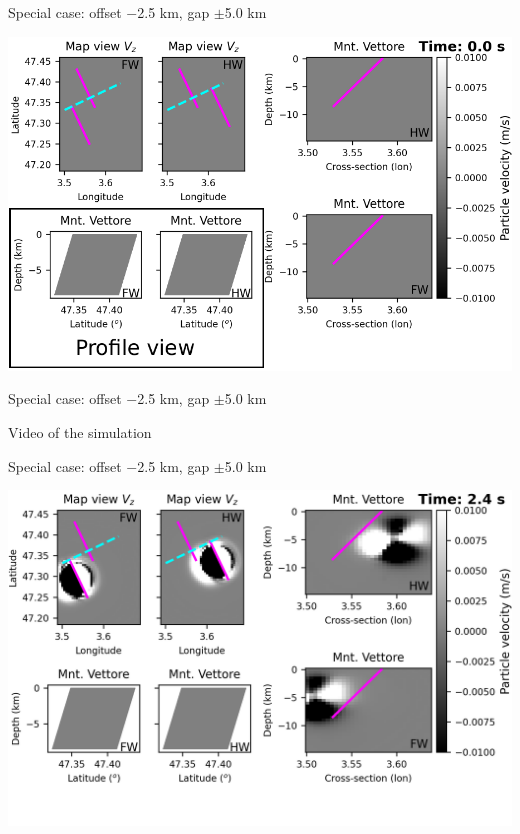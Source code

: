 \documentclass{beamer}
\begin{document}
\begin{frame}
 {Special case: offset $-$2.5 km, gap $\pm$5.0 km}

\begin{center}
    \includegraphics[width=1\linewidth]{images/horizontal_delta_00000c}
\end{center}
\addtocounter{framenumber}{-1}
 
\end{frame}


\begin{frame}
 {Special case: offset $-$2.5 km, gap $\pm$5.0 km}

 
\begin{center}

    Video of the simulation
    \vskip 0.2cm
\end{center}
\addtocounter{framenumber}{-1}
 
\end{frame}


\begin{frame}
 {Special case: offset $-$2.5 km, gap $\pm$5.0 km}

\begin{center}
    \includegraphics[width=1\linewidth]{images/video_waves/horizontal_delta_00012}
\end{center}
\addtocounter{framenumber}{-1}

\end{frame}
\end{document}
